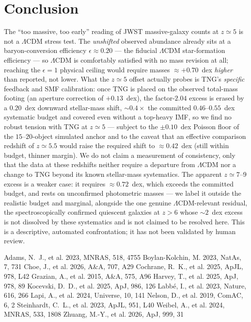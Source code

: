 \documentclass[twocolumn]{aastex631}
\begin{document}
\section{Conclusion}
The ``too massive, too early'' reading of JWST massive-galaxy counts at $z\simeq5$ is not a
$\Lambda$CDM stress test. The \emph{unshifted} observed abundance already sits at a baryon-conversion
efficiency $\epsilon\approx0.20$ --- the fiducial $\Lambda$CDM star-formation efficiency --- so
$\Lambda$CDM is comfortably satisfied with no mass revision at all; reaching the $\epsilon=1$ physical
ceiling would require masses $\approx+0.70$~dex \emph{higher} than reported, not lower. What the
$z\simeq5$ offset actually probes is TNG's \emph{specific} feedback and SMF calibration: once TNG is
placed on the observed total-mass footing (an aperture correction of $+0.13$~dex), the factor-$2.04$
excess is erased by a $0.20$~dex downward stellar-mass shift, $\sim0.4\times$ the committed
$0.46$--$0.55$~dex systematic budget and covered even without a top-heavy IMF, so we find no robust
tension with TNG at $z\simeq5$ --- subject to the $\pm0.10$~dex Poisson floor of the $15$--$20$-object
simulated anchor and to the caveat that an effective comparison redshift of $z\simeq5.5$ would raise
the required shift to $\approx0.42$~dex (still within budget, thinner margin). We do not claim a
measurement of consistency, only that the data at these redshifts neither require a departure from
$\Lambda$CDM nor a change to TNG beyond its known stellar-mass systematics. The apparent $z\simeq7$--9
excess is a weaker case: it requires $\approx0.72$~dex, which exceeds the committed budget, and rests
on unconfirmed photometric masses --- we label it outside the realistic budget and marginal, alongside
the one genuine $\Lambda$CDM-relevant residual, the spectroscopically confirmed quiescent galaxies at
$z>6$ whose $\sim2$~dex excess is not dissolved by these systematics and is not claimed to be resolved
here. This is a descriptive, automated confrontation; it has not been validated by human review.

\begin{thebibliography}{}
 Adams, N.~J., et al. 2023, MNRAS, 518, 4755
 Boylan-Kolchin, M. 2023, NatAs, 7, 731
 Choe, J., et al. 2026, A\&A, 707, A29
 Cochrane, R.~K., et al. 2025, ApJL, 978, L42
 Grazian, A., et al. 2015, A\&A, 575, A96
 Harvey, T., et al. 2025, ApJ, 978, 89
 Kocevski, D.~D., et al. 2025, ApJ, 986, 126
 Labb\'e, I., et al. 2023, Nature, 616, 266
 Lapi, A., et al. 2024, Universe, 10, 141
 Nelson, D., et al. 2019, ComAC, 6, 2
 Steinhardt, C.~L., et al. 2023, ApJL, 951, L40
 Weibel, A., et al. 2024, MNRAS, 533, 1808
 Zhuang, M.-Y., et al. 2026, ApJ, 999, 31
\end{thebibliography}
\end{document}
